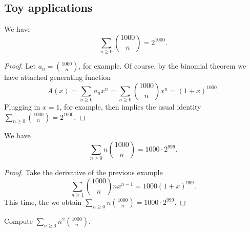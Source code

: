 \documentclass[11pt]{scrartcl}
\begin{document}
\subsection{Toy applications}
\begin{example}
  We have
  \[ \sum_{n \ge 0} \binom{1000}{n} = 2^{1000}. \]
\end{example}
\begin{proof}
  Let $a_n = \binom{1000}{n}$, for example.
  Of course, by the binomial theorem we have attached generating function
  \[ A(x) = \sum_{n \ge 0} a_n x^n
    = \sum_{n \ge 0} \binom{1000}{n} x^n
    = (1+x)^{1000}. \]
  Plugging in $x=1$, for example, then implies the usual identity
  $\sum_{n \ge 0} \binom{1000}{n} = 2^{1000}$.
\end{proof}
\begin{example}
  We have
  \[ \sum_{n \ge 0} n\binom{1000}{n} = 1000 \cdot 2^{999}. \]
\end{example}
\begin{proof}
  Take the derivative of the previous example
  \[ \sum_{n \ge 1} \binom{1000}{n} n x^{n-1}
    = 1000 (1+x)^{999}. \]
  This time, the we obtain
  $\sum_{n \ge 0} n \binom{1000}{n} = 1000 \cdot 2^{999}$.
\end{proof}
\begin{exercise}
  Compute $\sum_{n \ge 0} n^2\binom{1000}{n}$. %
\end{exercise}
\end{document}
